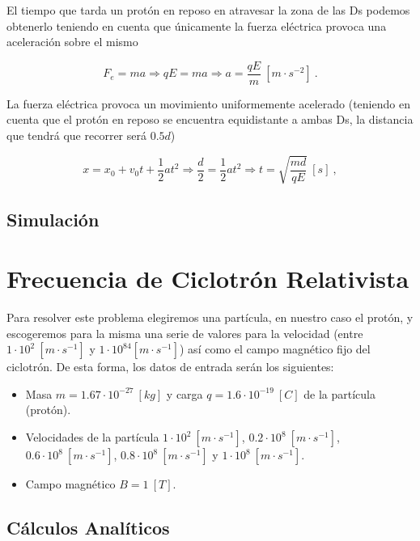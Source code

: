 \documentclass[journal]{IEEEtran}
\begin{document}
El tiempo que tarda un protón en reposo en atravesar la zona de las Ds podemos obtenerlo teniendo en cuenta que únicamente la fuerza eléctrica provoca una aceleración sobre el mismo

\begin{equation}
F_e = ma \Rightarrow qE = ma \Rightarrow a = \displaystyle\frac{qE}{m}~[m\cdot s^{-2}]~.
\end{equation}

La fuerza eléctrica provoca un movimiento uniformemente acelerado (teniendo en cuenta que el protón en reposo se encuentra equidistante a ambas Ds, la distancia que tendrá que recorrer será $0.5d$)

\begin{equation}
x = x_0 + v_0t + \displaystyle\frac{1}{2}at^2 \Rightarrow \displaystyle\frac{d}{2} = \displaystyle\frac{1}{2}at^2 \Rightarrow t = \sqrt{\displaystyle\frac{md}{qE}}~[s]~,
\end{equation}

\subsection{Simulación}

\clearpage

\section{Frecuencia de Ciclotrón Relativista}
\label{sec:frecuencia}

Para resolver este problema elegiremos una partícula, en nuestro caso el protón, y escogeremos para la misma una serie de valores para la velocidad (entre $1\cdot 10^2~[m\cdot s^{-1}]$ y $1\cdot 10^84[m\cdot s^{-1}]$) así como el campo magnético fijo del ciclotrón. De esta forma, los datos de entrada serán los siguientes:

\begin{itemize}
    \item Masa $m = 1.67\cdot 10^{-27}~[kg]$ y carga $q = 1.6\cdot 10^{-19}~[C]$ de la partícula (protón).
    \item Velocidades de la partícula $1\cdot 10^2~[m\cdot s^{-1}]$, $0.2\cdot 10^8~[m\cdot s^{-1}]$, $0.6\cdot 10^8~[m\cdot s^{-1}]$, $0.8\cdot 10^8~[m\cdot s^{-1}]$ y $1\cdot 10^8~[m\cdot s^{-1}]$.
    \item Campo magnético $B = 1~[T]$.
\end{itemize}

\subsection{Cálculos Analíticos}
\end{document}
